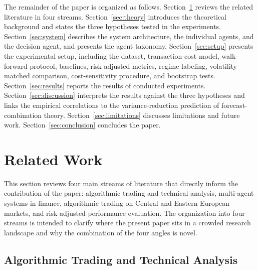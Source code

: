 \documentclass{ieeeaccess}
\begin{document}
The remainder of the paper is organized as follows. Section~\ref{sec:related_work} reviews the related literature in four streams. Section~\ref{sec:theory} introduces the theoretical background and states the three hypotheses tested in the experiments. Section~\ref{sec:system} describes the system architecture, the individual agents, and the decision agent, and presents the agent taxonomy. Section~\ref{sec:setup} presents the experimental setup, including the dataset, transaction-cost model, walk-forward protocol, baselines, risk-adjusted metrics, regime labeling, volatility-matched comparison, cost-sensitivity procedure, and bootstrap tests. Section~\ref{sec:results} reports the results of conducted experiments. Section~\ref{sec:discussion} interprets the results against the three hypotheses and links the empirical correlations to the variance-reduction prediction of forecast-combination theory. Section~\ref{sec:limitations} discusses limitations and future work. Section~\ref{sec:conclusion} concludes the paper.

\section{Related Work}
\label{sec:related_work}

This section reviews four main streams of literature that directly inform the contribution of the paper: algorithmic trading and technical analysis, multi-agent systems in finance, algorithmic trading on Central and Eastern European markets, and risk-adjusted performance evaluation. The organization into four streams is intended to clarify where the present paper sits in a crowded research landscape and why the combination of the four angles is novel.

\subsection{Algorithmic Trading and Technical Analysis}
\end{document}
